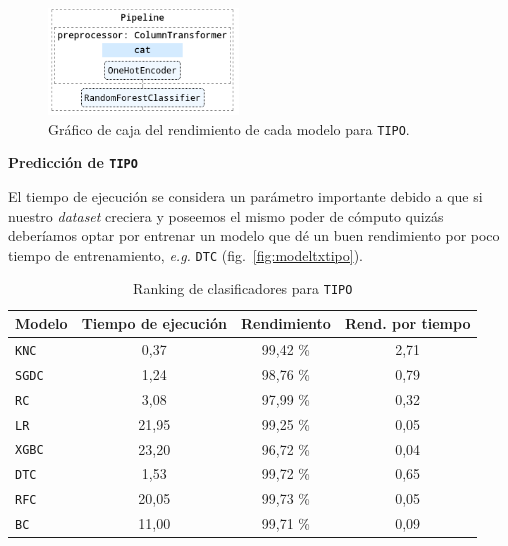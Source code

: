 \documentclass[a4paper,12pt]{article}
\begin{document}
\begin{figure}[H]
	\begin{center}
	\includegraphics[width=0.45\textwidth]{tesis_74.png}
  	\caption{Gráfico de caja del rendimiento de cada modelo para \texttt{TIPO}.}
  	\label{fig:sklearn}
  	\end{center}
\end{figure}

\textbf{Predicción de \texttt{TIPO}}

El tiempo de ejecución se considera un parámetro importante debido a que si nuestro \textit{dataset} creciera y poseemos el mismo poder de cómputo quizás deberíamos optar por entrenar un modelo que dé un buen rendimiento por poco tiempo de entrenamiento, \textit{e.g.} \texttt{DTC} (fig.~\ref{fig:modeltxtipo}).

\begin{table}[H]
\centering
\begin{tabular}{lccc}
\textbf{Modelo} & \textbf{Tiempo de ejecución} & \textbf{Rendimiento} & \textbf{Rend. por tiempo} \\ \hline
\texttt{KNC}  & 0,37  & 99,42 \% & 2,71 \\
\texttt{SGDC} & 1,24  & 98,76 \% & 0,79 \\
\texttt{RC}   & 3,08  & 97,99 \% & 0,32 \\
\texttt{LR}   & 21,95 & 99,25 \% & 0,05 \\
\texttt{XGBC} & 23,20 & 96,72 \% & 0,04 \\
\texttt{DTC}  & 1,53  & 99,72 \% & 0,65 \\
\texttt{RFC}  & 20,05 & 99,73 \% & 0,05 \\
\texttt{BC}   & 11,00 & 99,71 \% & 0,09
\end{tabular}
\caption{Ranking de clasificadores para \texttt{TIPO}}
\label{tab:classifiers-table}
\end{table}
\end{document}
